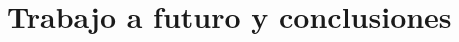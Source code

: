 \documentclass[../../main.tex]{subfiles}
\begin{document}
\graphicspath{{./figures}}
\chapter{Trabajo a futuro y conclusiones}
\end{document}
